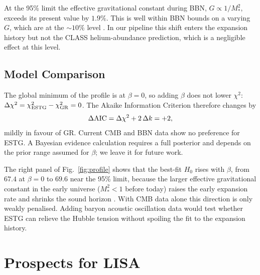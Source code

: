 \documentclass[11pt,a4paper]{article}
\begin{document}
At the 95\% limit the effective gravitational constant during BBN, $G \propto 1/M_*^2$, exceeds its present value by $1.9\%$. This is well within BBN bounds on a varying $G$, which are at the $\sim\!10\%$ level \cite{Copi2004}. In our pipeline this shift enters the expansion history but not the CLASS helium-abundance prediction, which is a negligible effect at this level.

\subsection{Model Comparison}
The global minimum of the profile is at $\beta = 0$, so adding $\beta$ does not lower $\chi^2$: $\Delta\chi^2 = \chi^2_{\rm ESTG} - \chi^2_{\rm GR} = 0$. The Akaike Information Criterion therefore changes by
\begin{equation}
\Delta{\rm AIC} = \Delta\chi^2 + 2\,\Delta k = +2 ,
\end{equation}
mildly in favour of GR. Current CMB and BBN data show no preference for ESTG. A Bayesian evidence calculation requires a full posterior and depends on the prior range assumed for $\beta$; we leave it for future work.

The right panel of Fig.~\ref{fig:profile} shows that the best-fit $H_0$ rises with $\beta$, from $67.4$ at $\beta=0$ to $69.6$ near the 95\% limit, because the larger effective gravitational constant in the early universe ($M_*^2 < 1$ before today) raises the early expansion rate and shrinks the sound horizon \cite{Ballardini2020}. With CMB data alone this direction is only weakly penalised. Adding baryon acoustic oscillation data would test whether ESTG can relieve the Hubble tension without spoiling the fit to the expansion history.

\section{Prospects for LISA}
\label{sec:lisa}
\end{document}
